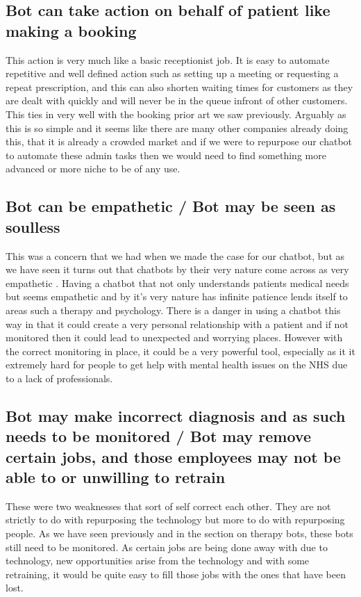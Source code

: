 \documentclass{article}
\begin{document}
\subsection{Bot can take action on behalf of patient like making a booking}
This action is very much like a basic receptionist job. It is easy to automate repetitive and well defined action such as setting up a meeting or requesting a repeat prescription, and this can also shorten waiting times for customers as they are dealt with quickly and will never be in the queue infront of other customers. This ties in very well with the booking prior art we saw previously. Arguably as this is so simple and it seems like there are many other companies already doing this, that it is already a crowded market and if we were to repurpose our chatbot to automate these admin tasks then we would need to find something more advanced or more niche to be of any use.

\subsection{Bot can be empathetic / Bot may be seen as soulless}
This was a concern that we had when we made the case for our chatbot, but as we have seen it turns out that chatbots by their very nature come across as very empathetic \cite{bedside}. Having a chatbot that not only understands patients medical needs but seems empathetic and by it's very nature has infinite patience lends itself to areas such a therapy and psychology. There is a danger in using a chatbot this way in that it could create a very personal relationship with a patient and if not monitored then it could lead to unexpected and worrying places. However with the correct monitoring in place, it could be a very powerful tool, especially as it it extremely hard for people to get help with mental health issues on the NHS due to a lack of professionals. 

\subsection{Bot may make incorrect diagnosis and as such needs to be monitored / Bot may remove certain jobs, and those employees may not be able to or unwilling to retrain}
These were two weaknesses that sort of self correct each other. They are not strictly to do with repurposing the technology but more to do with repurposing people. As we have seen previously and in the section on therapy bots, these bots still need to be monitored. As certain jobs are being done away with due to technology, new opportunities arise from the technology and with some retraining, it would be quite easy to fill those jobs with the ones that have been lost.
\end{document}
